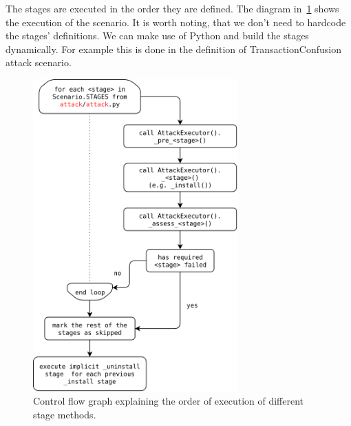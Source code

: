     The stages are executed in the order they are defined. The diagram in~\ref{fig:execute-scenario} shows the execution of the scenario. It is worth noting, that we don't need to hardcode the stages' definitions. We can make use of Python and build the stages dynamically. For example this is done in the definition of TransactionConfusion attack scenario.

        \begin{figure}[htb!]
            \centering
            \includegraphics[width=0.7\textwidth]{src/diagrams/execute-scenario.png}
            \caption{Control flow graph explaining the order of execution of different stage methods.}
            \label{fig:execute-scenario}
        \end{figure}


